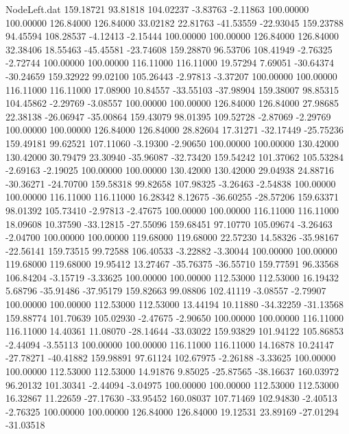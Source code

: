 \begin{filecontents}{NodeLeft.dat}
 159.18721   93.81818  104.02237    -3.83763   -2.11863  100.00000  100.00000  126.84000  126.84000   33.02182   22.81763  -41.53559  -22.93045
 159.23788   94.45594  108.28537    -4.12413   -2.15444  100.00000  100.00000  126.84000  126.84000   32.38406   18.55463  -45.45581  -23.74608
 159.28870   96.53706  108.41949    -2.76325   -2.72744  100.00000  100.00000  116.11000  116.11000   19.57294    7.69051  -30.64374  -30.24659
 159.32922   99.02100  105.26443    -2.97813   -3.37207  100.00000  100.00000  116.11000  116.11000   17.08900   10.84557  -33.55103  -37.98904
 159.38007   98.85315  104.45862    -2.29769   -3.08557  100.00000  100.00000  126.84000  126.84000   27.98685   22.38138  -26.06947  -35.00864
 159.43079   98.01395  109.52728    -2.87069   -2.29769  100.00000  100.00000  126.84000  126.84000   28.82604   17.31271  -32.17449  -25.75236
 159.49181   99.62521  107.11060    -3.19300   -2.90650  100.00000  100.00000  130.42000  130.42000   30.79479   23.30940  -35.96087  -32.73420
 159.54242  101.37062  105.53284    -2.69163   -2.19025  100.00000  100.00000  130.42000  130.42000   29.04938   24.88716  -30.36271  -24.70700
 159.58318   99.82658  107.98325    -3.26463   -2.54838  100.00000  100.00000  116.11000  116.11000   16.28342    8.12675  -36.60255  -28.57206
 159.63371   98.01392  105.73410    -2.97813   -2.47675  100.00000  100.00000  116.11000  116.11000   18.09608   10.37590  -33.12815  -27.55096
 159.68451   97.10770  105.09674    -3.26463   -2.04700  100.00000  100.00000  119.68000  119.68000   22.57230   14.58326  -35.98167  -22.56141
 159.73515   99.72588  106.40533    -3.22882   -3.30044  100.00000  100.00000  119.68000  119.68000   19.95412   13.27467  -35.76375  -36.55710
 159.77591   96.33568  106.84204    -3.15719   -3.33625  100.00000  100.00000  112.53000  112.53000   16.19432    5.68796  -35.91486  -37.95179
 159.82663   99.08806  102.41119    -3.08557   -2.79907  100.00000  100.00000  112.53000  112.53000   13.44194   10.11880  -34.32259  -31.13568
 159.88774  101.70639  105.02930    -2.47675   -2.90650  100.00000  100.00000  116.11000  116.11000   14.40361   11.08070  -28.14644  -33.03022
 159.93829  101.94122  105.86853    -2.44094   -3.55113  100.00000  100.00000  116.11000  116.11000   14.16878   10.24147  -27.78271  -40.41882
 159.98891   97.61124  102.67975    -2.26188   -3.33625  100.00000  100.00000  112.53000  112.53000   14.91876    9.85025  -25.87565  -38.16637
 160.03972   96.20132  101.30341    -2.44094   -3.04975  100.00000  100.00000  112.53000  112.53000   16.32867   11.22659  -27.17630  -33.95452
 160.08037  107.71469  102.94830    -2.40513   -2.76325  100.00000  100.00000  126.84000  126.84000   19.12531   23.89169  -27.01294  -31.03518

\end{filecontents}
